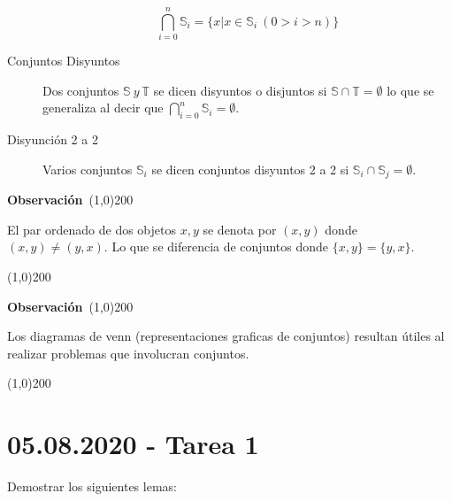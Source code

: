 \documentclass[a4paper,dvipsnames]{book}
\newenvironment{obs}
    {
        \begin{flushleft}
       \textbf{Observación}\
        \line(1,0){200} \
        \end{flushleft}
    }
    {
        \begin{flushright}
        \line(1,0){200}
        \end{flushright}
    }
\begin{document}
\begin{description}
\begin{equation*}
                \bigcap_{i=0}^{n}\mathbb S_{i} = \{x|x\in \mathbb S_{i}\ (0>i>n)\}
            \end{equation*}

        \item[Conjuntos Disyuntos] Dos conjuntos $\mathbb S\ y\ \mathbb T$ se
            dicen disyuntos o disjuntos si $\mathbb S\cap \mathbb T=\emptyset$
            lo que se generaliza al decir que $\bigcap_{i=0}^{n}\mathbb
            S_{i}=\emptyset$.

        \item[Disyunción 2 a 2] Varios conjuntos $\mathbb S_i$ se dicen
            conjuntos disyuntos 2 a 2 si $\mathbb S_i \cap \mathbb
            S_j=\emptyset$.
    \end{description}

    \begin{obs}
        El par ordenado de dos objetos $x,y$ se denota por $(x,y)$ donde
        $(x,y)\ne(y,x)$. Lo que se diferencia de conjuntos donde
        $\{x,y\}=\{y,x\}$.
    \end{obs}

    \begin{obs}
        Los diagramas de venn (representaciones graficas de conjuntos) resultan
        útiles al realizar problemas que involucran conjuntos.
    \end{obs}

        \section{05.08.2020 - Tarea 1}



        \item Demostrar los siguientes lemas:
\end{document}
